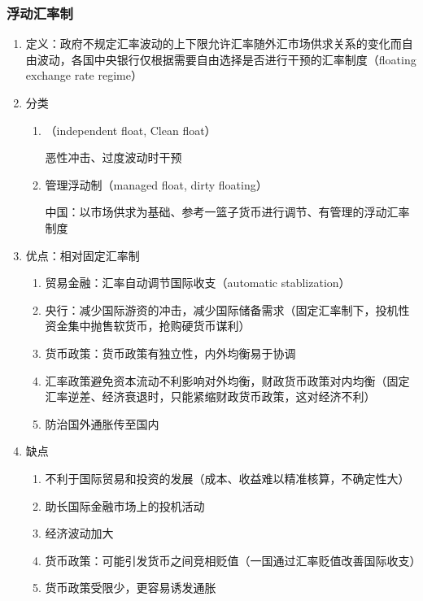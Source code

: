 \documentclass[12pt]{book}
\begin{document}
\subsubsection{浮动汇率制}


\begin{enumerate}[1.]
    \item 定义：政府不规定汇率波动的上下限允许汇率随外汇市场供求关系的变化而自由波动，各国中央银行仅根据需要自由选择是否进行干预的汇率制度（floating exchange rate regime）
    \item 分类
          \begin{enumerate}[(1)]
              \item （independent float, Clean float）
                    \par 恶性冲击、过度波动时干预
              \item 管理浮动制（managed float, dirty floating）
                    \par 中国：以市场供求为基础、参考一篮子货币进行调节、有管理的浮动汇率制度
          \end{enumerate}
    \item 优点：相对固定汇率制
          \begin{enumerate}[(1)]
              \item 贸易金融：汇率自动调节国际收支（automatic stablization）
              \item 央行：减少国际游资的冲击，减少国际储备需求（固定汇率制下，投机性资金集中抛售软货币，抢购硬货币谋利）
              \item 货币政策：货币政策有独立性，内外均衡易于协调
              \item 汇率政策避免资本流动不利影响对外均衡，财政货币政策对内均衡（固定汇率逆差、经济衰退时，只能紧缩财政货币政策，这对经济不利）
              \item 防治国外通胀传至国内
          \end{enumerate}
    \item 缺点
          \begin{enumerate}[(1)]
              \item 不利于国际贸易和投资的发展（成本、收益难以精准核算，不确定性大）
              \item 助长国际金融市场上的投机活动
              \item 经济波动加大
              \item 货币政策：可能引发货币之间竞相贬值（一国通过汇率贬值改善国际收支）
              \item 货币政策受限少，更容易诱发通胀
          \end{enumerate}
\end{enumerate}
\end{document}
